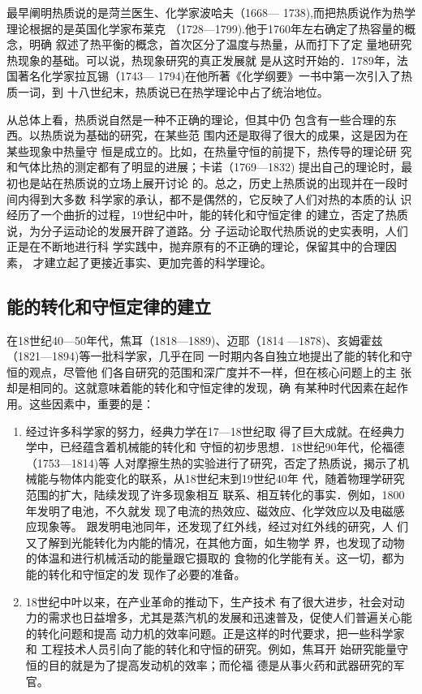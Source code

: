 最早阐明热质说的是菏兰医生、化学家波哈夫（1668—
1738),而把热质说作为热学理论根据的是英国化学家布莱克
（1728—1799).他于1760年左右确定了热容量的概念，明确
叙述了热平衡的概念，首次区分了温度与热量，从而打下了定
量地研究热现象的基础。可以说，热现象研究的真正发展就
是从这时开始的．1789年，法国著名化学家拉瓦锡（1743—
1794)在他所著《化学纲要》一书中第一次引入了热质一词，到
十八世纪末，热质说已在热学理论中占了统治地位。

从总体上看，热质说自然是一种不正确的理论，但其中仍
包含有一些合理的东西。以热质说为基础的研究，在某些范
围内还是取得了很大的成果，这是因为在某些现象中热量守
恒是成立的。比如，在热量守恒的前提下，热传导的理论研
究和气体比热的测定都有了明显的进展；卡诺（1769—1832)
提出自己的理论时，最初也是站在热质说的立场上展开讨论
的。总之，历史上热质说的出现并在一段时间内得到大多数
科学家的承认，都不是偶然的，它反映了人们对热的本质的认
识经历了一个曲折的过程，19世纪中叶，能的转化和守恒定律
的建立，否定了热质说，为分子运动论的发展开辟了道路。分
子运动论取代热质说的史实表明，人们正是在不断地进行科
学实践中，抛弃原有的不正确的理论，保留其中的合理因素，
才建立起了更接近事实、更加完善的科学理论。

\subsection{能的转化和守恒定律的建立}
在18世纪40—50年代，焦耳（1818—1889)、迈耶（1814
—1878)、亥姆霍兹（1821—1894)等一批科学家，几乎在同
一时期内各自独立地提出了能的转化和守恒的观点，尽管他
们各自研究的范围和深广度并不一样，但在核心问题上的主
张却是相同的。这就意味着能的转化和守恒定律的发现，确
有某种时代因素在起作用。这些因素中，重要的是：
\begin{enumerate}
    \item 经过许多科学家的努力，经典力学在17—18世纪取
得了巨大成就。在经典力学中，已经蕴含着机械能的转化和
守恒的初步思想．18世纪90年代，伦福德（1753—1814)等
人对摩擦生热的实验进行了研究，否定了热质说，揭示了机
械能与物体内能变化的联系，从18世纪末到19世纪40年
代，随着物理学研究范围的扩大，陆续发现了许多现象相互
联系、相互转化的事实．例如，1800年发明了电池，不久就发
现了电流的热效应、磁效应、化学效应以及电磁感应现象等。
跟发明电池同年，还发现了红外线，经过对红外线的研究，人
们又了解到光能转化为内能的情况，在其他方面，如生物学
界，也发现了动物的体温和进行机械活动的能量跟它摄取的
食物的化学能有关。这一切，都为能的转化和守恒定的发
现作了必要的准备。
\item 18世纪中叶以来，在产业革命的推动下，生产技术
有了很大进步，社会对动力的需求也日益增多，尤其是蒸汽机的发展和迅速普及，促使人们普遍关心能的转化问题和提高
动力机的效率问题。正是这样的时代要求，把一些科学家和
工程技术人员引向了能的转化和守恒的研究。例如，焦耳开
始研究能量守恒的目的就是为了提高发动机的效率；而伦福
德是从事火药和武器研究的军官。
\end{enumerate}

